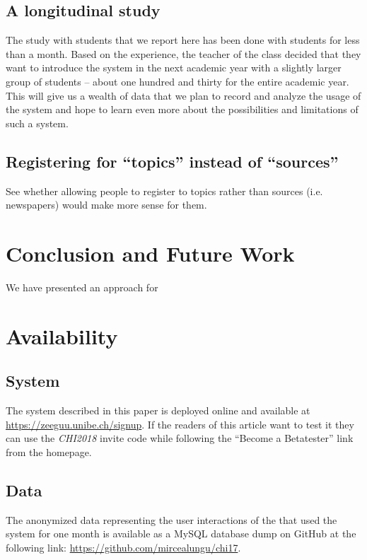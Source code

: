 \subsection{A longitudinal study}
The study with students that we report here has been done with \stcnt students for less than a month. Based on the experience, the teacher of the class decided that they want to introduce the system in the next academic year with a slightly larger group of students -- about one hundred and thirty for the entire academic year. This will give us a wealth of data that we plan to record and analyze the usage of the system and hope to learn even more about the possibilities and limitations of such a system. 

\subsection{Registering for ``topics'' instead of ``sources''}
See whether allowing people to register to topics rather than sources (i.e. newspapers) would make more sense for them. 



\section{Conclusion and Future Work}
We have presented an approach for 


\section{Availability}

\subsection{System}
The system described in this paper is deployed online and available at \url{https://zeeguu.unibe.ch/signup}. If the readers of this article want to test it they can use the {\em CHI2018} invite code while following the  ``Become a Betatester'' link from the homepage.

\subsection{Data}
The anonymized data representing the user interactions of the \students that used the system for one month is available as a MySQL database dump on GitHub at the following link: \url{https://github.com/mircealungu/chi17}.


